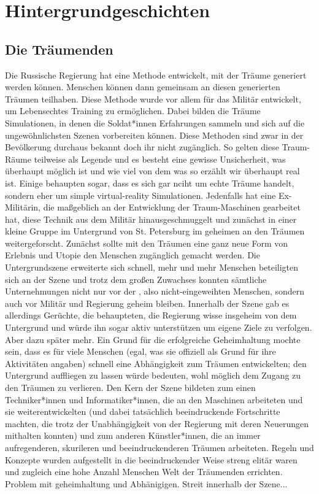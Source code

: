 \documentclass[12pt, a4paper, openany]{report}
\begin{document}
\section{Hintergrundgeschichten}

\subsection{Die Träumenden} 
Die Russische Regierung hat eine Methode entwickelt, mit der Träume generiert werden können.
Menschen können dann gemeinsam an diesen generierten Träumen teilhaben. 
Diese Methode wurde vor allem für das Militär entwickelt, um Lebensechtes Training zu ermöglichen.
Dabei bilden die Träume Simulationen, in denen die Soldat*innen Erfahrungen sammeln und sich auf die ungewöhnlichsten Szenen vorbereiten können.
Diese Methoden sind zwar in der Bevölkerung durchaus bekannt doch ihr nicht zugänglich. 
So gelten diese Traum-Räume teilweise als Legende und es besteht eine gewisse Unsicherheit, was überhaupt möglich ist und wie viel von dem was so erzählt wir überhaupt real ist. 
Einige behaupten sogar, dass es sich gar nciht um echte Träume handelt, sondern eher um simple virtual-reality Simulationen. 
Jedenfalls hat eine Ex-Militärin, die maßgeblich an der Entwicklung der Traum-Maschinen gearbeitet hat, diese Technik aus dem Militär hinausgeschmuggelt und zunächst in einer kleine Gruppe im Untergrund von St. Petersburg im geheimen an den Träumen weitergeforscht. 
Zunächst sollte mit den Träumen eine ganz neue Form von Erlebnis und Utopie den Menschen zugänglich gemacht werden. 
Die Untergrundszene erweiterte sich schnell, mehr und mehr Menschen beteiligten sich an der Szene und trotz dem großen Zuwachses konnten sämtliche Unternehmungen nicht nur vor der , also nicht-eingeweihten Menschen, sondern auch vor Militär und Regierung geheim bleiben. 
Innerhalb der Szene gab es allerdings Gerüchte, die behaupteten, die Regierung wisse insgeheim von dem Untergrund und würde ihn sogar aktiv unterstützen um eigene Ziele zu verfolgen. 
Aber dazu später mehr.
Ein Grund für die erfolgreiche Geheimhaltung mochte sein, dass es für viele Menschen (egal, was sie offiziell als Grund für ihre Aktivitäten angaben) schnell eine Abhängigkeit zum Träumen entwickelten; den Untergrund auffliegen zu lassen würde bedeuten, wohl möglich dem Zugang zu den Träumen zu verlieren.
Den Kern der Szene bildeten zum einen Techniker*innen und Informatiker*innen, die an den Maschinen arbeiteten und sie weiterentwickelten (und dabei tatsächlich beeindruckende Fortschritte machten, die trotz der Unabhängigkeit von der Regierung mit deren Neuerungen mithalten konnten) und zum anderen Künstler*innen, die an immer aufregenderen, skurileren und beeindruckenderen Träumen arbeiteten. 
Regeln und Konzepte wurden aufgestellt in die beeindruckender Weise streng elitär waren und zugleich eine hohe Anzahl Menschen 
Welt der Träumenden errichten. Problem mit geheimhaltung und Abhänigigen. Streit innerhalb der Szene...
\end{document}
